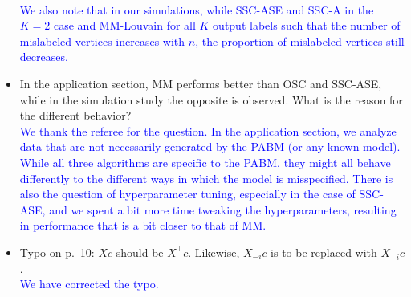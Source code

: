 \documentclass[
]{article}
\begin{document}
\begin{itemize}
{  }\\
  \textcolor{blue}{
  We also note that in our simulations, while SSC-ASE and SSC-A in the $K = 2$ case and MM-Louvain for all $K$ output labels such that the number of mislabeled vertices increases with $n$, the proportion of mislabeled vertices still decreases.
  }
\item
  In the application section, MM performs better than OSC and SSC-ASE,
  while in the simulation study the opposite is observed. What is the
  reason for the different behavior?\\
  \textcolor{blue}{
  We thank the referee for the question. 
  In the application section, we analyze data that are not necessarily generated by the PABM (or any known model). 
  While all three algorithms are specific to the PABM, they might all behave differently to the different ways in which the model is misspecified. 
  There is also the question of hyperparameter tuning, especially in the case of SSC-ASE, and we spent a bit more time tweaking the hyperparameters, resulting in performance that is a bit closer to that of MM. 
  }
\item
  Typo on p.~10: \(X c\) should be \(X^\top c\). Likewise, \(X_{-i} c\)
  is to be replaced with \(X_{-i}^\top c\).\\
  \textcolor{blue}{
  We have corrected the typo.
  }
\end{itemize}

\newpage

  
\end{document}

